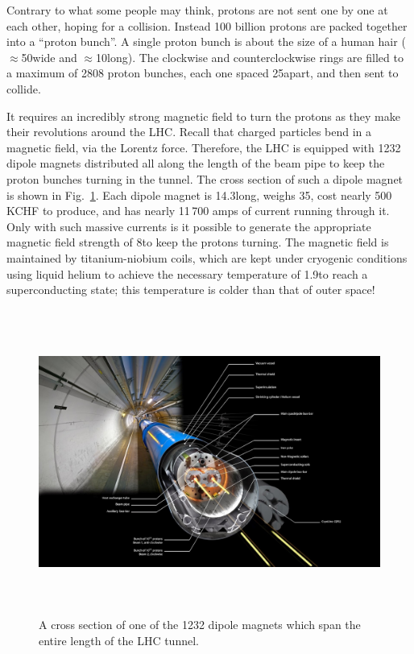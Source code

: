Contrary to what some people may think, protons are not sent one by one at each other, hoping for a collision.
Instead 100 billion protons are packed together into a ``proton bunch''.
A single proton bunch is about the size of a human hair ($\approx$50\mum wide and $\approx$10\cm long). 
The clockwise and counterclockwise rings are filled to a maximum of 2808 proton bunches, each one spaced 25\ns apart, and then sent to collide. 

It requires an incredibly strong magnetic field to turn the protons as they make their revolutions around the LHC. 
Recall that charged particles bend in a magnetic field, via the Lorentz force. 
Therefore, the LHC is equipped with 1232 dipole magnets distributed all along the length of the beam pipe to keep the proton bunches turning in the tunnel.
The cross section of such a dipole magnet is shown in Fig.~\ref{fig:lhc_dipole_xs}.
Each dipole magnet is 14.3\meter long, weighs 35\tonne, cost nearly 500\,KCHF to produce, and has nearly 11\,700 amps of current running through it. 
Only with such massive currents is it possible to generate the appropriate magnetic field strength of 8\tesla to keep the protons turning. 
The magnetic field is maintained by titanium-niobium coils, which are kept under cryogenic conditions using liquid helium to achieve the necessary temperature of 1.9\kelvin to reach a superconducting state; 
this temperature is colder than that of outer space!
\begin{figure}[pbth]
\centering
\includegraphics[width=15cm,height=10cm,keepaspectratio]{figures/lhc/lhc_dipole_xs.jpg}
    \caption{
    A cross section of one of the 1232 dipole magnets which span the entire length of the LHC tunnel.} 
    \label{fig:lhc_dipole_xs}
\end{figure}

